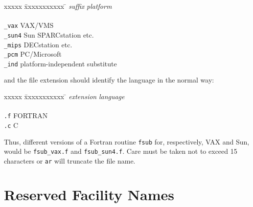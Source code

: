 \documentclass[twoside,11pt]{article}
\renewcommand{\_}{{\tt\char'137}}
\begin{document}
\begin{itemize}
   \begin{tabbing}
   xxxxx \= xxxxxxxxxxx \= \kill
     \> {\it suffix} \> {\it platform} \\ \\
     \> \verb|_vax| \> VAX/VMS \\
     \> \verb|_sun4| \> Sun SPARCstation etc. \\
     \> \verb|_mips| \> DECstation etc. \\
     \> \verb|_pcm| \> PC/Microsoft \\
     \> \verb|_ind| \> platform-independent substitute
   \end{tabbing}

   and the file extension should identify the language in the normal way:
   \begin{tabbing}
   xxxxx \= xxxxxxxxxxx \= \kill
     \> {\it extension} \> {\it language} \\ \\
     \> \verb|.f| \> FORTRAN \\
     \> \verb|.c| \> C
   \end{tabbing}

   Thus, different versions of a Fortran routine \verb|fsub|
   for, respectively, VAX and Sun, would be \verb|fsub_vax.f|
   and \verb|fsub_sun4.f|.  Care must be taken not to exceed
   15 characters or \verb|ar| will truncate the file name.
\end{itemize}

\newpage
\appendix
\section{Reserved Facility Names}
\end{document}
